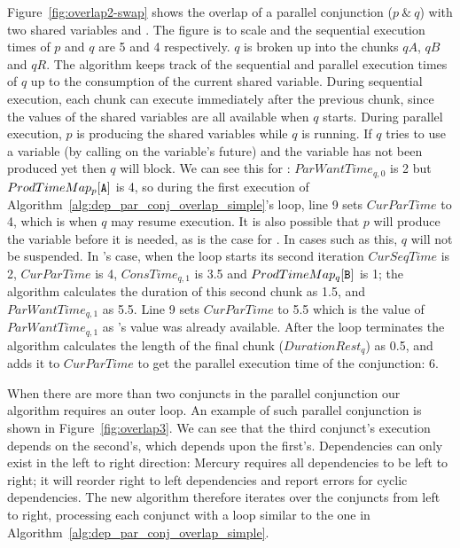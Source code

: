 Figure~\ref{fig:overlap2-swap} shows the overlap of a parallel conjunction
($p~\&~q$) with two shared variables  and .
The figure is to scale and the sequential execution times of $p$ and $q$ are
5 and 4 respectively.
$q$ is broken up into the chunks $qA$, $qB$ and $qR$.
The algorithm keeps track of the sequential and parallel execution times of $q$
up to the consumption of the current shared variable.
During sequential execution,
each chunk can execute immediately after the previous chunk,
since the values of the shared variables are all available when $q$ starts.
During parallel execution,
$p$ is producing the shared variables while $q$ is running.
If $q$ tries to use a variable (by calling \wait on the variable's future)
and the variable has not been produced yet then $q$ will block.
We can see this for :
$ParWantTime_{q, 0}$ is 2 but $ProdTimeMap_p[\text{{\tt A}}]$ is 4,
so during the first execution of
Algorithm~\ref{alg:dep_par_conj_overlap_simple}'s loop,
line 9 sets $CurParTime$ to 4,
which is when $q$ may resume execution.
It is also possible that $p$ will produce the variable before it is
needed, as is the case for .
In cases such as this, $q$ will not be suspended.
In 's case,
when the loop starts its second iteration $CurSeqTime$ is 2,
$CurParTime$ is 4, $ConsTime_{q, 1}$ is 3.5 and
$ProdTimeMap_q[\text{{\tt B}}]$ is 1;
the algorithm calculates the duration of this second chunk as 1.5,
and $ParWantTime_{q, 1}$ as 5.5.
Line 9 sets $CurParTime$ to 5.5 which is the value of $ParWantTime_{q, 1}$
as 's value was already available.
After the loop terminates the algorithm calculates the length of the final
chunk ($DurationRest_q$) as 0.5,
and adds it to $CurParTime$ to get the parallel execution time of the
conjunction: 6.


When there are more than two conjuncts in the parallel conjunction our
algorithm requires an outer loop.
An example of such parallel conjunction is shown in Figure~\ref{fig:overlap3}.
We can see that the third conjunct's execution depends on the second's,
which depends upon the first's.
Dependencies can only exist in the left to right direction:
Mercury requires all dependencies to be left to right;
it will reorder right to left dependencies and report errors for
cyclic dependencies.
The new algorithm therefore iterates over the conjuncts from left to right,
processing each conjunct with a loop similar to the one in
Algorithm~\ref{alg:dep_par_conj_overlap_simple}.

